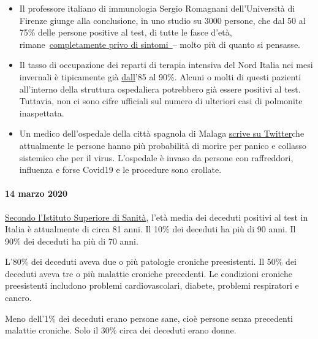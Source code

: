 \begin{itemize}
\tightlist
\item
  Il professore italiano di immunologia Sergio Romagnani dell'Università
  di Firenze giunge alla conclusione, in uno studio su 3000 persone, che
  dal 50 al 75\% delle persone positive al test, di tutte le fasce
  d'età,
  rimane~\href{https://www.repubblica.it/salute/medicina-e-ricerca/2020/03/16/news/coronavirus_studio_il_50-75_dei_casi_a_vo_sono_asintomatici_e_molto_contagiosi-251474302/}{completamente
  privo di sintomi~}-- molto più di quanto si pensasse.
\item
  Il tasso di occupazione dei reparti di terapia intensiva del Nord
  Italia nei mesi invernali è tipicamente già
  \href{https://jamanetwork.com/journals/jama/fullarticle/2763188}{dall}'85
  al 90\%. Alcuni o molti di questi pazienti all'interno della struttura
  ospedaliera potrebbero già essere positivi al test. Tuttavia, non ci
  sono cifre ufficiali sul numero di ulteriori casi di polmonite
  inaspettata.
\item
  Un medico dell'ospedale della città spagnola di Malaga
  \href{https://twitter.com/NeurologaenSAS/status/1239498772570308609}{scrive
  su Twitter}che attualmente le persone hanno più probabilità di morire
  per panico e collasso sistemico che per il virus. L'ospedale è invaso
  da persone con raffreddori, influenza e forse Covid19 e le procedure
  sono crollate.
\end{itemize}

\hypertarget{14-marzo-2020}{%
\paragraph{14 marzo 2020}\label{14-marzo-2020}}

\href{https://www.epicentro.iss.it/coronavirus/sars-cov-2-decessi-italia}{Secondo
l'Istituto Superiore di Sanità}, l'età media dei deceduti positivi al
test in Italia è attualmente di circa 81 anni. Il 10\% dei deceduti ha
più di 90 anni. Il 90\% dei deceduti ha più di 70 anni.

 L'80\% dei deceduti aveva due o più patologie croniche preesistenti. Il
50\% dei deceduti aveva tre o più malattie croniche precedenti. Le
condizioni croniche preesistenti includono problemi cardiovascolari,
diabete, problemi respiratori e cancro.

Meno dell'1\% dei deceduti erano persone sane, cioè persone senza
precedenti malattie croniche. Solo il 30\% circa dei deceduti erano
donne.

